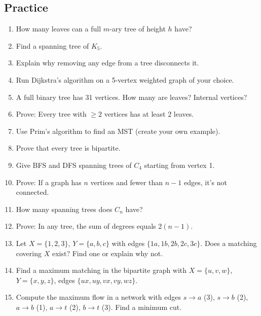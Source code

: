 \subsection*{Practice}
\begin{enumerate}
  \item How many leaves can a full $m$-ary tree of height $h$ have?

  \item Find a spanning tree of $K_5$.

  \item Explain why removing any edge from a tree disconnects it.

  \item Run Dijkstra's algorithm on a 5-vertex weighted graph of your choice.

  \item A full binary tree has 31 vertices. How many are leaves? Internal vertices?

  \item Prove: Every tree with $\geq 2$ vertices has at least 2 leaves.

  \item Use Prim's algorithm to find an MST (create your own example).

  \item Prove that every tree is bipartite.

  \item Give BFS and DFS spanning trees of $C_4$ starting from vertex 1.

  \item Prove: If a graph has $n$ vertices and fewer than $n - 1$ edges, it's not connected.

  \item How many spanning trees does $C_n$ have?

  \item Prove: In any tree, the sum of degrees equals $2(n-1)$.

  \item Let $X = \{1,2,3\}$, $Y = \{a,b,c\}$ with edges $\{1a, 1b, 2b, 2c, 3c\}$. Does a matching covering $X$ exist? Find one or explain why not.

  \item Find a maximum matching in the bipartite graph with $X=\{u,v,w\}$, $Y=\{x,y,z\}$, edges $\{ux, uy, vx, vy, wz\}$.

  \item Compute the maximum flow in a network with edges $s \to a$ (3), $s \to b$ (2), $a \to b$ (1), $a \to t$ (2), $b \to t$ (3). Find a minimum cut.


\end{enumerate}

